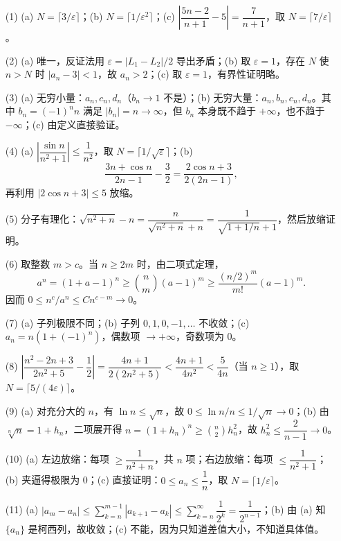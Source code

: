 \documentclass[fontset=fandol]{ctexart}
\begin{document}
\begin{enumerate}
\item[(1)] 
   (a) \(N = \lceil 3/\varepsilon \rceil\)；(b) \(N = \lceil 1/\varepsilon^2 \rceil\)；(c) \(\left|\dfrac{5n-2}{n+1} - 5\right| = \dfrac{7}{n+1}\)，取 \(N = \lceil 7/\varepsilon \rceil\)。

\item[(2)] 
   (a) 唯一，反证法用 \(\varepsilon = |L_1 - L_2|/2\) 导出矛盾；(b) 取 \(\varepsilon = 1\)，存在 \(N\) 使 \(n > N\) 时 \(|a_n-3|<1\)，故 \(a_n > 2\)；(c) 取 \(\varepsilon=1\)，有界性证明略。

\item[(3)] 
   (a) 无穷小量：\(a_n, c_n, d_n\)（\(b_n \to 1\) 不是）；(b) 无穷大量：\(a_n,b_n,c_n,d_n\)。其中 \(b_n=(-1)^n n\) 满足 \(|b_n|=n\to\infty\)，但 \(b_n\) 本身既不趋于 \(+\infty\)，也不趋于 \(-\infty\)；(c) 由定义直接验证。

\item[(4)] 
   (a) \(\left|\dfrac{\sin n}{n^2+1}\right| \leq \dfrac{1}{n^2}\)，取 \(N = \lceil 1/\sqrt{\varepsilon} \rceil\)；(b)
   \[
   \frac{3n+\cos n}{2n-1}-\frac32
   =\frac{2\cos n+3}{2(2n-1)},
   \]
   再利用 \(|2\cos n+3|\leq5\) 放缩。

\item[(5)] 
   分子有理化：\(\sqrt{n^2+n} - n = \dfrac{n}{\sqrt{n^2+n}+n} = \dfrac{1}{\sqrt{1+1/n}+1}\)，然后放缩证明。

\item[(6)] 
   取整数 \(m>c\)。当 \(n\geq2m\) 时，由二项式定理，
   \[
   a^n=(1+a-1)^n\geq\binom{n}{m}(a-1)^m
   \geq\frac{(n/2)^m}{m!}(a-1)^m.
   \]
   因而 \(0\leq n^c/a^n\leq Cn^{c-m}\to0\)。

\item[(7)] 
   (a) 子列极限不同；(b) 子列 \(0,1,0,-1,\dots\) 不收敛；(c) \(a_n = n(1+(-1)^n)\)，偶数项 \(\to +\infty\)，奇数项为 0。

\item[(8)] 
   \(\left|\dfrac{n^2-2n+3}{2n^2+5} - \dfrac{1}{2}\right| = \dfrac{4n+1}{2(2n^2+5)} < \dfrac{4n+1}{4n^2} < \dfrac{5}{4n}\)（当 \(n \geq 1\)），取 \(N = \lceil 5/(4\varepsilon) \rceil\)。

\item[(9)] 
   (a) 对充分大的 \(n\)，有 \(\ln n\leq\sqrt n\)，故 \(0\leq \ln n/n\leq1/\sqrt n\to0\)；(b) 由 \(\sqrt[n]{n}=1+h_n\)，二项展开得 \(n=(1+h_n)^n\geq\binom{n}{2}h_n^2\)，故 \(h_n^2\leq\dfrac{2}{n-1}\to0\)。

\item[(10)] 
   (a) 左边放缩：每项 \(\geq \dfrac{1}{n^2+n}\)，共 \(n\) 项；右边放缩：每项 \(\leq \dfrac{1}{n^2+1}\)；(b) 夹逼得极限为 0；(c) 直接证明：\(0 \leq a_n \leq \dfrac{1}{n}\)，取 \(N = \lceil 1/\varepsilon \rceil\)。

\item[(11)] 
   (a) \(|a_m - a_n| \leq \sum_{k=n}^{m-1} |a_{k+1}-a_k| \leq \sum_{k=n}^{\infty} \dfrac{1}{2^k} = \dfrac{1}{2^{n-1}}\)；(b) 由 (a) 知 \(\{a_n\}\) 是柯西列，故收敛；(c) 不能，因为只知道差值大小，不知道具体值。
\end{enumerate}
\fi
\end{document}
